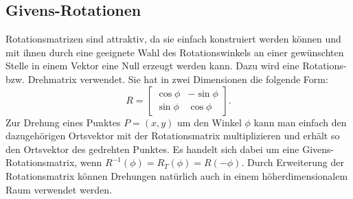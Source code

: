 \subsection{Givens-Rotationen\label{francis:section:grundlagen:givens}}
Rotationsmatrizen sind attraktiv, da sie einfach konstruiert werden können und mit ihnen durch eine geeignete Wahl des Rotationswinkels an einer gewünschten Stelle in einem Vektor eine Null erzeugt werden kann.
Dazu wird eine Rotations- bzw. Drehmatrix verwendet.
Sie hat in zwei Dimensionen die folgende Form:
\begin{equation}
	R=\begin{bmatrix}
	\cos\phi & -\sin\phi \\
	\sin\phi & \cos\phi
	\end{bmatrix}.
\end{equation}
Zur Drehung eines Punktes $P=(x,y)$ um den Winkel $\phi$ kann man einfach den dazugehörigen Ortsvektor mit der Rotationsmatrix multiplizieren und erhält so den Ortsvektor des gedrehten Punktes.
Es handelt sich dabei um eine Givens-Rotationsmatrix, wenn $R^{-1}(\phi)=R_{T}(\phi)=R(-\phi)$.
Durch Erweiterung der Rotationsmatrix können Drehungen natürlich auch in einem höherdimensionalem Raum verwendet werden.

